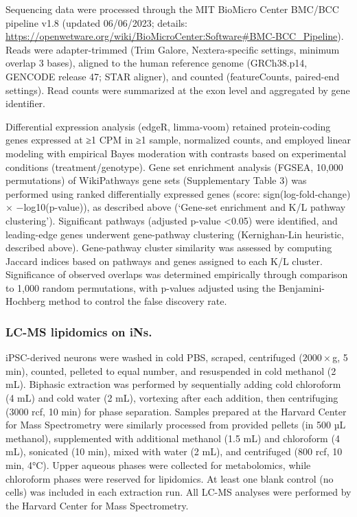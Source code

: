 Sequencing data were processed through the MIT BioMicro Center BMC/BCC pipeline v1.8 (updated 06/06/2023; details: \url{https://openwetware.org/wiki/BioMicroCenter:Software#BMC-BCC_Pipeline}). Reads were adapter-trimmed (Trim Galore, Nextera-specific settings, minimum overlap 3 bases), aligned to the human reference genome (GRCh38.p14, GENCODE release 47; STAR aligner), and counted (featureCounts, paired-end settings). Read counts were summarized at the exon level and aggregated by gene identifier.

Differential expression analysis (edgeR, limma-voom) retained protein-coding genes expressed at ≥1 CPM in ≥1 sample, normalized counts, and employed linear modeling with empirical Bayes moderation with contrasts based on experimental conditions (treatment/genotype). Gene set enrichment analysis (FGSEA, 10,000 permutations) of WikiPathways gene sets (Supplementary Table 3) was performed using ranked differentially expressed genes (score: sign(log-fold-change) × −log10(p-value)), as described above (‘Gene-set enrichment and K/L pathway clustering’). Significant pathways (adjusted p-value <0.05) were identified, and leading-edge genes underwent gene-pathway clustering (Kernighan-Lin heuristic, described above).
Gene-pathway cluster similarity was assessed by computing Jaccard indices based on pathways and genes assigned to each K/L cluster. Significance of observed overlaps was determined empirically through comparison to 1,000 random permutations, with p-values adjusted using the Benjamini-Hochberg method to control the false discovery rate.

\subsubsection{LC-MS lipidomics on iNs.}
iPSC-derived neurons were washed in cold PBS, scraped, centrifuged ($2000 \times $g, 5 min), counted, pelleted to equal number, and resuspended in cold methanol (2 mL). Biphasic extraction was performed by sequentially adding cold chloroform (4 mL) and cold water (2 mL), vortexing after each addition, then centrifuging (3000 rcf, 10 min) for phase separation. Samples prepared at the Harvard Center for Mass Spectrometry were similarly processed from provided pellets (in 500 µL methanol), supplemented with additional methanol (1.5 mL) and chloroform (4 mL), sonicated (10 min), mixed with water (2 mL), and centrifuged (800 rcf, 10 min, 4°C). Upper aqueous phases were collected for metabolomics, while chloroform phases were reserved for lipidomics. At least one blank control (no cells) was included in each extraction run. All LC-MS analyses were performed by the Harvard Center for Mass Spectrometry.


